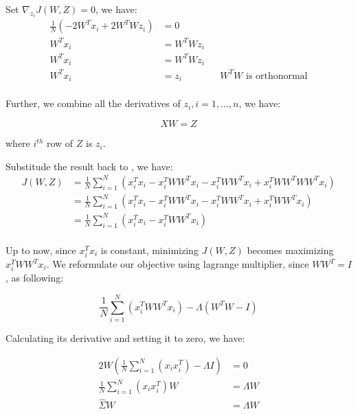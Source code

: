 \documentclass[a4paper]{book}
\begin{document}
  Set $\nabla_{z_{i}}J(W, Z) = 0$, we have:
  \begin{align*}
    \frac{1}{N} (-2W^{T}x_{i} + 2W^{T}Wz_{i}) &= 0 \\
    W^{T}x_{i} &= W^{T}Wz_{i}  \\
    W^{T}x_{i} &= W^{T}Wz_{i}  \\
    W^{T}x_{i} &= z_{i}  && \text{$W^{T}W$ is orthonormal}\\
  \end{align*}

  Further, we combine all the derivatives of $z_{i}, i = 1, ..., n$, we
  have:

  \begin{displaymath}
    XW = Z
  \end{displaymath}

  where $i^{th}$ row of $Z$ is $z_{i}$.

  Substitude the result back to , we have:
  \begin{align*}
    J(W, Z) & = \frac{1}{N} \sum\limits^{N}_{i=1}(x_{i}^{T}x_{i} -
            x_{i}^{T}WW^{T}x_{i} - x_{i}^{T}WW^{T}x_{i} +
            x_{i}^{T}WW^{T}WW^{T}x_{i}) \\
            & = \frac{1}{N} \sum\limits^{N}_{i=1}(x_{i}^{T}x_{i} -
            x_{i}^{T}WW^{T}x_{i} - x_{i}^{T}WW^{T}x_{i} +
            x_{i}^{T}WW^{T}x_{i}) \\
            & = \frac{1}{N} \sum\limits^{N}_{i=1}(x_{i}^{T}x_{i} -
            x_{i}^{T}WW^{T}x_{i}) \\
  \end{align*}

  Up to now, since $x_{i}^{T}x_{i}$ is constant, minimizing $J(W, Z)$
  becomes maximizing $x_{i}^{T}WW^{T}x_{i}$. We reformulate our
  objective using lagrange multiplier, since $WW^{T} = I$, as following:

  \begin{displaymath}
    \frac{1}{N} \sum\limits^{N}_{i=1}(x_{i}^{T}WW^{T}x_{i}) - \Lambda(W^{T}W - I)
  \end{displaymath}

  Calculating its derivative and setting it to zero, we have:

  \begin{align*}
    2W(\frac{1}{N} \sum\limits^{N}_{i=1}(x_{i}x_{i}^{T}) - \Lambda I)
                      &= 0\\
                    \frac{1}{N} \sum\limits^{N}_{i=1}(x_{i}x_{i}^{T})W
                      &= \Lambda W \\
                    \hat{\Sigma}W
                      &= \Lambda W
  \end{align*}
\end{document}
